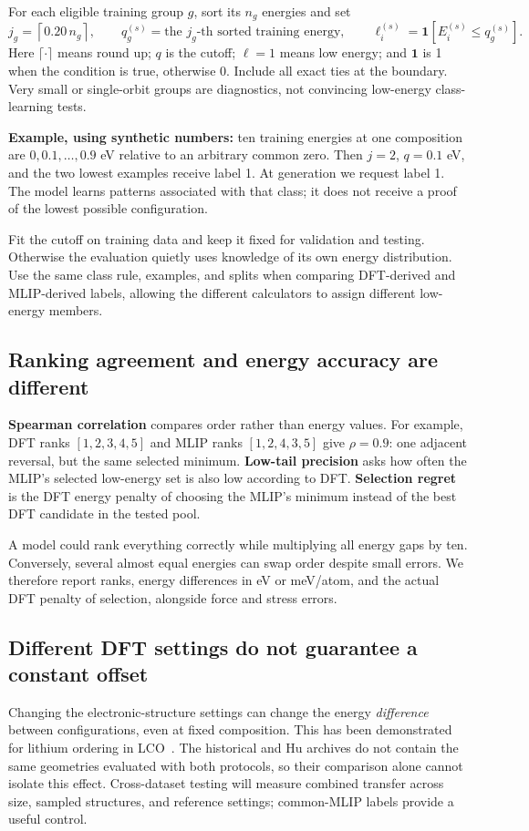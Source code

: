 For each eligible training group $g$, sort its $n_g$ energies and set
\[
 j_g=\left\lceil0.20\,n_g\right\rceil,\qquad
 q_g^{(s)}=\text{the }j_g\text{-th sorted training energy},\qquad
 \ell_i^{(s)}=\mathbf1\!\left[E_i^{(s)}\le q_g^{(s)}\right].
\]
Here $\lceil\cdot\rceil$ means round up; $q$ is the cutoff; $\ell=1$ means low energy; and $\mathbf1$ is 1 when the condition is true, otherwise 0. Include all exact ties at the boundary. Very small or single-orbit groups are diagnostics, not convincing low-energy class-learning tests.

\textbf{Example, using synthetic numbers:} ten training energies at one composition are $0,0.1,\ldots,0.9$ eV relative to an arbitrary common zero. Then $j=2$, $q=0.1$ eV, and the two lowest examples receive label 1. At generation we request label 1. The model learns patterns associated with that class; it does not receive a proof of the lowest possible configuration.

Fit the cutoff on training data and keep it fixed for validation and testing. Otherwise the evaluation quietly uses knowledge of its own energy distribution. Use the same class rule, examples, and splits when comparing DFT-derived and MLIP-derived labels, allowing the different calculators to assign different low-energy members.

\subsection*{Ranking agreement and energy accuracy are different}
\textbf{Spearman correlation} compares order rather than energy values. For example, DFT ranks $[1,2,3,4,5]$ and MLIP ranks $[1,2,4,3,5]$ give $\rho=0.9$: one adjacent reversal, but the same selected minimum. \textbf{Low-tail precision} asks how often the MLIP's selected low-energy set is also low according to DFT. \textbf{Selection regret} is the DFT energy penalty of choosing the MLIP's minimum instead of the best DFT candidate in the tested pool.

A model could rank everything correctly while multiplying all energy gaps by ten. Conversely, several almost equal energies can swap order despite small errors. We therefore report ranks, energy differences in eV or meV/atom, and the actual DFT penalty of selection, alongside force and stress errors.

\subsection*{Different DFT settings do not guarantee a constant offset}
Changing the electronic-structure settings can change the energy \emph{difference} between configurations, even at fixed composition. This has been demonstrated for lithium ordering in LCO~\cite{isaacs}. The historical and Hu archives do not contain the same geometries evaluated with both protocols, so their comparison alone cannot isolate this effect. Cross-dataset testing will measure combined transfer across size, sampled structures, and reference settings; common-MLIP labels provide a useful control.

